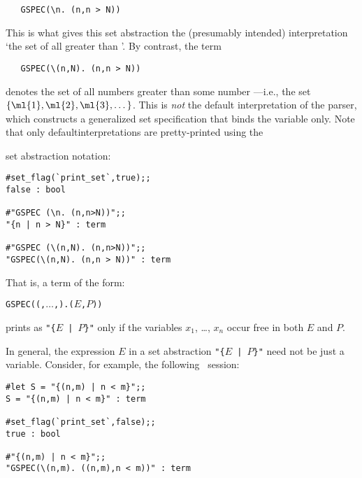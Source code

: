 \begin{hol}\begin{verbatim}
   GSPEC(\n. (n,n > N))
\end{verbatim}\end{hol}

\noindent This is what gives this set abstraction the (presumably intended)
interpretation `the set of all  greater than '.  By contrast, the
term

\begin{hol}\begin{verbatim}
   GSPEC(\(n,N). (n,n > N))
\end{verbatim}\end{hol}

\noindent denotes the set of all numbers  greater than some number
---i.e., the set $\{\ml{1},\ml{2},\ml{3},\dots\}$.  This is {\it not\/}
the default interpretation of the parser, which constructs a generalized set
specification that binds the variable  only. Note that only
default\pagebreak[3] interpretations are pretty-printed using the {\samepage
set abstraction notation:

\begin{session}\begin{verbatim}
#set_flag(`print_set`,true);;
false : bool

#"GSPEC (\n. (n,n>N))";;
"{n | n > N}" : term

#"GSPEC (\(n,N). (n,n>N))";;
"GSPEC(\(n,N). (n,n > N))" : term
\end{verbatim}\end{session}

\noindent That is, a term of the form:

\begin{hol}\begin{alltt}
   GSPEC (\bk(,\(\dots\),).(\(E\),\(P\)))
\end{alltt}\end{hol}

\noindent prints as {\small\verb!"{!$E$\verb! | !$P$\verb!}"!} only if the
variables $x_1$, \dots, $x_n$ occur free in both $E$ and $P$.}


In general, the expression $E$ in a set abstraction
{\small\verb!"{!$E$\verb! | !$P$\verb!}"!} need not be just a variable.
Consider, for example, the following \HOL\ session:

\begin{session}\begin{verbatim}
#let S = "{(n,m) | n < m}";;
S = "{(n,m) | n < m}" : term

#set_flag(`print_set`,false);;
true : bool

#"{(n,m) | n < m}";;
"GSPEC(\(n,m). ((n,m),n < m))" : term
\end{verbatim}\end{session}

